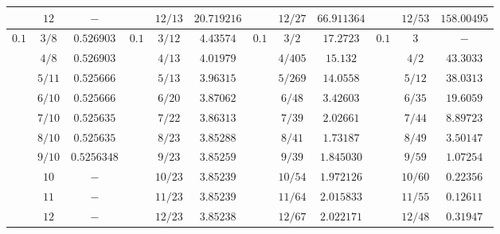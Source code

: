 \documentclass[10pt]{article}
\begin{document}
\begin{table}[h!]
{\begin{tabular}{ccc|ccc|ccc|ccc}
     $    $  & $12$& $-       $   &$    $  & $12/13$& $20.719216$  &$   $  & $12/27$& $66.911364$   &$   $  & $12/53$& $158.00495 $   \\
       \hline																					
		$0.1  $& $3/8$  &  $0.526903$ &$0.1 $   & $3/12$ & $4.43574$  &$0.1$   & $3/2$   & $17.2723$     &$0.1$  & $3$    & $-      $ \\
			     & $4/8$  &  $0.526903$ &$	  $   & $4/13$ & $4.01979$  &$	  $  & $4/405$ & $15.132$      &$   $  & $4/2$  & $43.3033$ \\
			     & $5/11$  &  $0.525666$ &$	  $   & $5/13$ & $3.96315$  &$	  $  & $5/269$ & $14.0558$     &$   $  & $5/12$ & $38.0313$ \\
			     & $6/10$  &  $0.525666$ &$	  $   & $6/20$ & $3.87062$  &$	  $  & $6/48$  & $3.42603$     &$   $  & $6/35$ & $19.6059$ \\
			     & $7/10$  &  $0.525635$ &$	  $   & $7/22$ & $3.86313$  &$	  $  & $7/39$  & $2.02661$     &$   $  & $7/44$ & $8.89723$ \\
			     & $8/10$  &  $0.525635$ &$	  $   & $8/23$ & $3.85288$  &$	  $  & $8/41$  & $1.73187$     &$   $  & $8/49$ & $3.50147$ \\
			     & $9/10$  &  $0.5256348$&$	  $   & $9/23$ & $3.85259$  &        & $9/39$  & $1.845030$    &       & $9/59$ & $1.07254$\\
			     & $10$    &  $-$        &$	  $   & $10/23$& $3.85239$  &        & $10/54$ & $1.972126$    &       & $10/60$& $0.22356$\\
			     & $11$    &  $-$        &$	  $   & $11/23$& $3.85239$  &        & $11/64$ & $2.015833$    &       & $11/55$& $0.12611$\\
			     & $12$    &  $-$        &$	  $   & $12/23$& $3.85238$  &        & $12/67$ & $2.022171$    &       & $12/48$& $0.31947$\\
	\end{tabular}}                                                                                  
\end{table}
\end{document}
